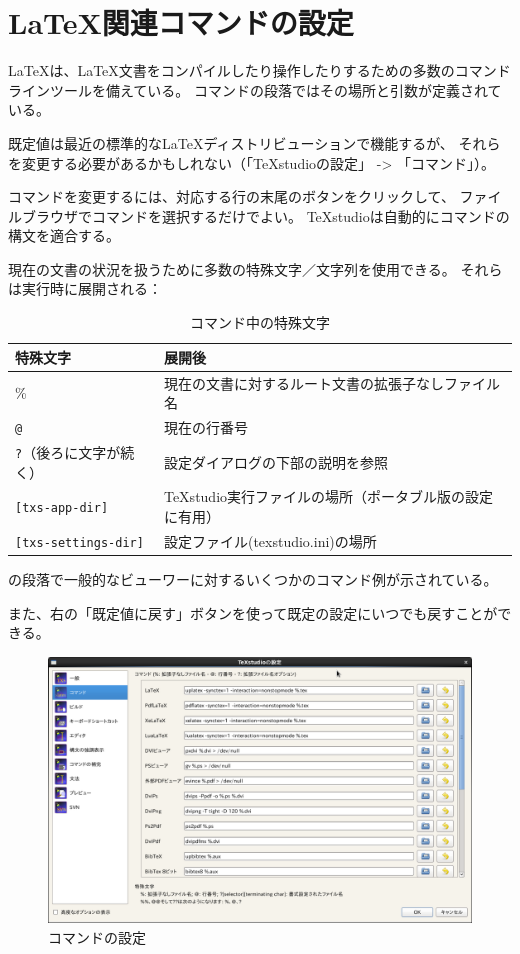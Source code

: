 \section{LaTeX関連コマンドの設定}\label{sec:conf_latexcommand}

LaTeXは、LaTeX文書をコンパイルしたり操作したりするための多数のコマンドラインツールを備えている。
コマンドの段落ではその場所と引数が定義されている。

既定値は最近の標準的なLaTeXディストリビューションで機能するが、
それらを変更する必要があるかもしれない（「TeXstudioの設定」 -\textgreater{} 「コマンド」）。


コマンドを変更するには、対応する行の末尾のボタンをクリックして、
ファイルブラウザでコマンドを選択するだけでよい。
TeXstudioは自動的にコマンドの構文を適合する。

現在の文書の状況を扱うために多数の特殊文字／文字列を使用できる。
それらは実行時に展開される：

\begin{table}[H]
  \centering
  \caption{コマンド中の特殊文字}
  \begin{tabularx}{\linewidth}{lX}
    \hline
    \textbf{特殊文字} & \textbf{展開後}\\
    \hline
    \% & 現在の文書に対するルート文書の拡張子なしファイル名\\
    \verb+@+ & 現在の行番号\\
    \verb+?+（後ろに文字が続く） & 設定ダイアログの下部の説明を参照\\
    \verb+[txs-app-dir]+ & TeXstudio実行ファイルの場所（ポータブル版の設定に有用）\\
    \verb+[txs-settings-dir]+ & 設定ファイル(texstudio.ini)の場所\\
    \hline
  \end{tabularx}
\end{table}

の段落で一般的なビューワーに対するいくつかのコマンド例が示されている。

また、右の「既定値に戻す」ボタンを使って既定の設定にいつでも戻すことができる。

\begin{figure}[H]
  \centering
  \includegraphics[width=.8\linewidth]{configure_commands.png}
  \caption{コマンドの設定}
\end{figure}

